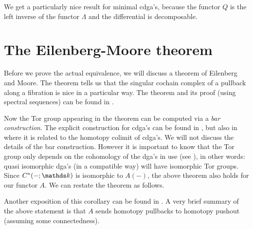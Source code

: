 We get a particularly nice result for minimal cdga's, because the functor $Q$ is the left inverse of the functor $\Lambda$ and the differential is decomposable.



\section{The Eilenberg-Moore theorem}
Before we prove the actual equivalence, we will discuss a theorem of Eilenberg and Moore. The theorem tells us that the singular cochain complex of a pullback along a fibration is nice in a particular way. The theorem and its proof (using spectral sequences) can be found in \cite[Theorem 7.14]{mccleary}.


Now the Tor group appearing in the theorem can be computed via a \emph{bar construction}. The explicit construction for cdga's can be found in \cite{bousfield}, but also in \cite{olsson} where it is related to the homotopy colimit of cdga's. We will not discuss the details of the bar construction. However it is important to know that the Tor group only depends on the cohomology of the dga's in use (see \cite[Corollary 7.7]{mccleary}), in other words: quasi isomorphic dga's (in a compatible way) will have isomorphic Tor groups. Since $C^\ast(-;\k)$ is isomorphic to $A(-)$, the above theorem also holds for our functor $A$. We can restate the theorem as follows.

Another exposition of this corollary can be found in \cite[Section 8.4]{berglund}. A very brief summary of the above statement is that $A$ sends homotopy pullbacks to homotopy pushout (assuming some connectedness).

